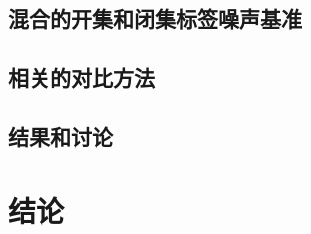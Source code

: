 \documentclass[12pt]{article}
\begin{document}
\subsection{混合的开集和闭集标签噪声基准}
\subsection{相关的对比方法}
\subsection{结果和讨论}
\section{结论}



\end{document}
